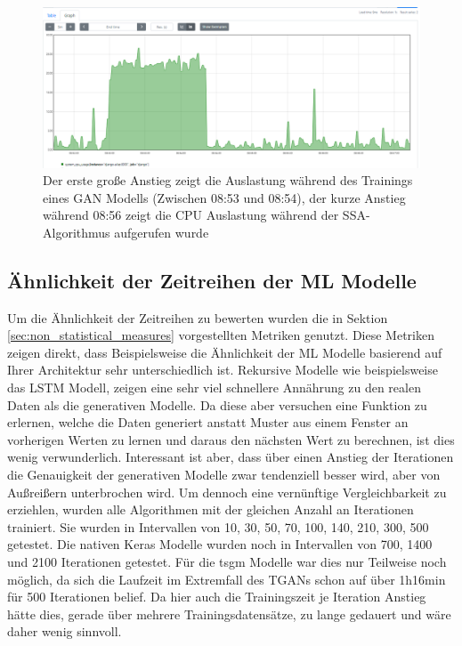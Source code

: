 \begin{figure}[ht]
    \centering
    \includegraphics[width=1\textwidth]{includes/figures/tooling/performance.png}
    \caption[\ac{CPU} Auslastung der Django API]{Der erste große Anstieg zeigt die Auslastung während des Trainings eines GAN Modells (Zwischen 08:53 und 08:54), der kurze Anstieg während 08:56 zeigt die CPU Auslastung während der SSA-Algorithmus aufgerufen wurde}
    \label{fig:cpu_usage_in_container}
\end{figure}










\subsection{Ähnlichkeit der Zeitreihen der \ac{ML} Modelle}
\label{sec:similarity_of_time_series}
Um die Ähnlichkeit der Zeitreihen zu bewerten wurden die in Sektion \ref{sec:non_statistical_measures} vorgestellten Metriken genutzt.
Diese Metriken zeigen direkt, dass Beispielsweise die Ähnlichkeit der \ac{ML} Modelle basierend auf Ihrer Architektur sehr unterschiedlich ist.
Rekursive Modelle wie beispielsweise das \ac{LSTM} Modell, zeigen eine sehr viel schnellere Annährung zu den realen Daten als die generativen Modelle.
Da diese aber versuchen eine Funktion zu erlernen, welche die Daten generiert anstatt Muster aus einem Fenster an vorherigen Werten zu lernen und daraus den nächsten Wert zu berechnen, ist dies wenig verwunderlich.
Interessant ist aber, dass über einen Anstieg der Iterationen die Genauigkeit der generativen Modelle zwar tendenziell besser wird, aber von Außreißern unterbrochen wird.
Um dennoch eine vernünftige Vergleichbarkeit zu erziehlen, wurden alle Algorithmen mit der gleichen Anzahl an Iterationen trainiert. Sie wurden in Intervallen von 10, 30, 50, 70, 100, 140, 210, 300, 500 getestet. Die nativen Keras Modelle wurden noch in Intervallen von 700, 1400 und 2100 Iterationen getestet.
Für die tsgm Modelle war dies nur Teilweise noch möglich, da sich die Laufzeit im Extremfall des \ac{TGAN}s schon auf über 1h16min für 500 Iterationen belief. Da hier auch die Trainingszeit je Iteration Anstieg hätte dies, gerade über mehrere Trainingsdatensätze, zu lange gedauert und wäre daher wenig sinnvoll.

